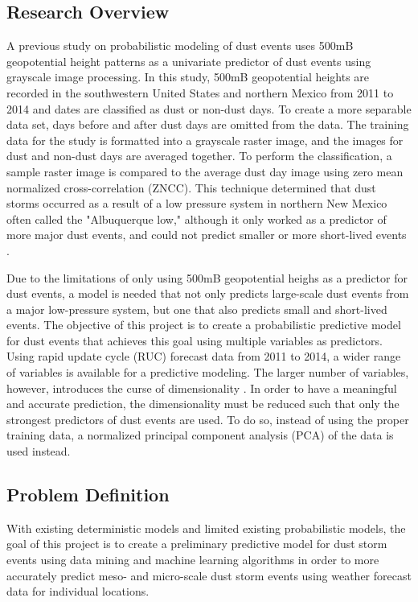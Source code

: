 \documentclass{article}
\begin{document}
\subsection{Research Overview}
A previous study on probabilistic modeling of dust events uses 500mB geopotential height patterns as a univariate predictor of dust events using grayscale image processing. In this study, 500mB geopotential heights are recorded in the southwestern United States and northern Mexico from 2011 to 2014 and dates are classified as dust or non-dust days. To create a more separable data set, days before and after dust days are omitted from the data. The training data for the study is formatted into a grayscale raster image, and the images for dust and non-dust days are averaged together. To perform the classification, a sample raster image is compared to the average dust day image using zero mean normalized cross-correlation (ZNCC). This technique determined that dust storms occurred as a result of a low pressure system in northern New Mexico often called the "Albuquerque low," although it only worked as a predictor of more major dust events, and could not predict smaller or more short-lived events \cite{500mb}.

Due to the limitations of only using 500mB geopotential heighs as a predictor for dust events, a model is needed that not only predicts large-scale dust events from a major low-pressure system, but one that also predicts small and short-lived events. The objective of this project is to create a probabilistic predictive model for dust events that achieves this goal using multiple variables as predictors. Using rapid update cycle (RUC) forecast data from 2011 to 2014, a wider range of variables is available for a predictive modeling. The larger number of variables, however, introduces the curse of dimensionality \cite{tan}. In order to have a meaningful and accurate prediction, the dimensionality must be reduced such that only the strongest predictors of dust events are used. To do so, instead of using the proper training data, a normalized principal component analysis (PCA) of the data is used instead.
\subsection{Problem Definition}
With existing deterministic models and limited existing probabilistic models, the goal of this project is to create a preliminary predictive model for dust storm events using data mining and machine learning algorithms in order to more accurately predict meso- and micro-scale dust storm events using weather forecast data for individual locations.
\end{document}
